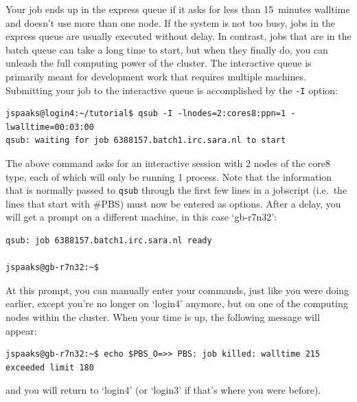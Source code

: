 Your job ends up in the express queue if it asks for less than 15~minutes walltime and doesn't use more than one node. If the system is not too busy, jobs in the express queue are usually executed without delay. In contrast, jobs that are in the batch queue can take a long time to start, but when they finally do, you can unleash the full computing power of the cluster. The interactive queue is primarily meant for development work that requires multiple machines. Submitting your job to the interactive queue is accomplished by the \lstinline[style=bashinline]{-I} option:
\begin{lstlisting}[style=basic,style=bash]
jspaaks@login4:~/tutorial$ qsub -I -lnodes=2:cores8:ppn=1 -lwalltime=00:03:00
qsub: waiting for job 6388157.batch1.irc.sara.nl to start
\end{lstlisting}
The above command asks for an interactive session with 2 nodes of the core8 type, each of which will only be running 1 process. Note that the information that is normally passed to \lstinline[style=bashinline]{qsub} through the first few lines in a jobscript (i.e.~the lines that start with \#PBS) must now be entered as options. After a delay, you will get a prompt on a different machine, in this case `gb-r7n32':

\begin{lstlisting}[style=basic,style=bash]
qsub: job 6388157.batch1.irc.sara.nl ready

jspaaks@gb-r7n32:~$ 
\end{lstlisting}
At this prompt, you can manually enter your commands, just like you were doing earlier, except you're no longer on `login4' anymore, but on one of the computing nodes within the cluster. When your time is up, the following message will appear:
\begin{lstlisting}[style=basic,style=bash]
jspaaks@gb-r7n32:~$ echo $PBS_O=>> PBS: job killed: walltime 215 exceeded limit 180
\end{lstlisting}
and you will return to `login4' (or `login3' if that's where you were before).

